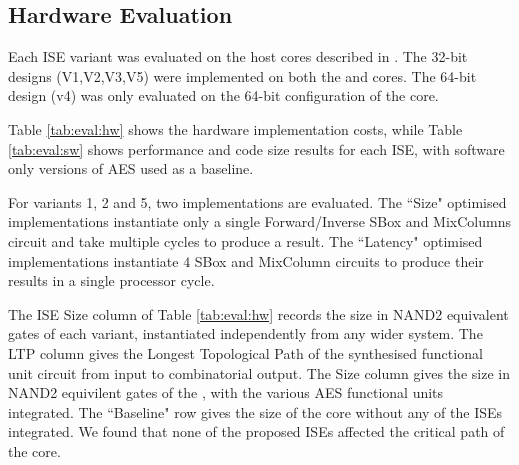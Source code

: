 
\subsection{Hardware Evaluation}
\label{sec:eval:sw}

Each ISE variant was evaluated on the host cores
described in .
The 32-bit designs (V1,V2,V3,V5) were implemented on both the
 and  cores.
The 64-bit design (v4) was only evaluated on the 64-bit configuration
of the  core.

Table \ref{tab:eval:hw}
shows the hardware implementation costs, while
Table \ref{tab:eval:sw}
shows performance and code size results for
each ISE, with software only versions of AES used as a baseline.

For variants 1, 2 and 5, two implementations are evaluated.
The ``Size" optimised implementations instantiate only a single
Forward/Inverse SBox and MixColumns circuit and take multiple cycles
to produce a result.
The ``Latency" optimised implementations instantiate $4$ SBox and
MixColumn circuits to produce their results in a single processor cycle.

The ISE Size column of Table \ref{tab:eval:hw} 
records the size in NAND2 equivalent gates of each variant,
instantiated independently from any wider system.
The LTP column gives the Longest Topological Path of the synthesised
functional unit circuit from input to combinatorial output.
The  Size column gives the size in NAND2 equivilent gates of the
, with the various AES functional units integrated.
The ``Baseline" row gives the size of the core without any of the
ISEs integrated.
We found that none of the proposed ISEs affected the critical
path of the  core.


